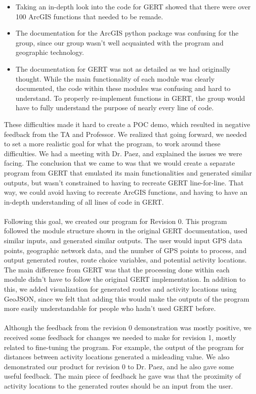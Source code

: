 \documentclass{article}
\begin{document}
\begin{itemize}
    \item Taking an in-depth look into the code for GERT showed that there were over 100 ArcGIS functions that needed to be remade. 
    \item The documentation for the ArcGIS python package was confusing for the group, since our group wasn't well acquainted with the program and geographic technology.
    \item The documentation for GERT was not as detailed as we had originally thought. While the main functionality of each module was clearly documented, the code within these modules was confusing and hard to understand. To properly re-implement functions in GERT, the group would have to fully understand the purpose of nearly every line of code.
\end{itemize}
These difficulties made it hard to create a POC demo, which resulted in negative feedback from the TA and Professor. We realized that going forward, we needed to set a more realistic goal for what the program, to work around these difficulties. We had a meeting with Dr. Paez, and explained the issues we were facing. The conclusion that we came to was that we would create a separate program from GERT that emulated its main functionalities and generated similar outputs, but wasn't constrained to having to recreate GERT line-for-line. That way, we could avoid having to recreate ArcGIS functions, and having to have an in-depth understanding of all lines of code in GERT.
\\ \\
Following this goal, we created our program for Revision 0. This program followed the module structure shown in the original GERT documentation, used similar inputs, and generated similar outputs. The user would input GPS data points, geographic network data, and the number of GPS points to process, and output generated routes, route choice variables, and potential activity locations. The main difference from GERT was that the processing done within each module didn't have to follow the original GERT implementation. In addition to this, we added visualization for generated routes and activity locations using GeoJSON, since we felt that adding this would make the outputs of the program more easily understandable for people who hadn't used GERT before.
\\ \\ 
Although the feedback from the revision 0 demonstration was mostly positive, we received some feedback for changes we needed to make for revision 1, mostly related to fine-tuning the program. For example, the output of the program for distances between activity locations generated a misleading value. We also demonstrated our product for revision 0 to Dr. Paez, and he also gave some useful feedback. The main piece of feedback he gave was that the proximity of activity locations to the generated routes should be an input from the user.
\end{document}
